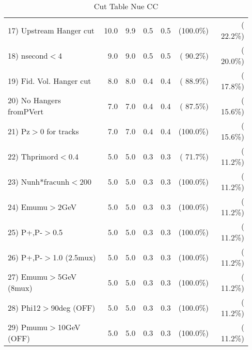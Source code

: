 \begin{table}[h!]
\begin{tabular}{||l||r|r|r|r|r|r||}
 17) Upstream Hanger cut  &         10.0 &          9.9 &          0.5 &          0.5 & (100.0\%) & ( 22.2\%) \\
 18) nsecond$<$4          &          9.0 &          9.0 &          0.5 &          0.5 & ( 90.2\%) & ( 20.0\%) \\
 19) Fid. Vol. Hanger cut &          8.0 &          8.0 &          0.4 &          0.4 & ( 88.9\%) & ( 17.8\%) \\
 20) No Hangers fromPVert &          7.0 &          7.0 &          0.4 &          0.4 & ( 87.5\%) & ( 15.6\%) \\
 21) Pz$>$0 for tracks    &          7.0 &          7.0 &          0.4 &          0.4 & (100.0\%) & ( 15.6\%) \\
 22) Thprimord$<$0.4      &          5.0 &          5.0 &          0.3 &          0.3 & ( 71.7\%) & ( 11.2\%) \\
 23) Nunh*fracunh$<$200   &          5.0 &          5.0 &          0.3 &          0.3 & (100.0\%) & ( 11.2\%) \\
 24) Emumu$>$2GeV         &          5.0 &          5.0 &          0.3 &          0.3 & (100.0\%) & ( 11.2\%) \\
 25) P+,P-$>$0.5          &          5.0 &          5.0 &          0.3 &          0.3 & (100.0\%) & ( 11.2\%) \\
 26) P+,P-$>$1.0 (2.5mux) &          5.0 &          5.0 &          0.3 &          0.3 & (100.0\%) & ( 11.2\%) \\
 27) Emumu$>$5GeV  (8mux) &          5.0 &          5.0 &          0.3 &          0.3 & (100.0\%) & ( 11.2\%) \\
 28) Phi12$>$90deg  (OFF) &          5.0 &          5.0 &          0.3 &          0.3 & (100.0\%) & ( 11.2\%) \\
 29) Pmumu$>$10GeV  (OFF) &          5.0 &          5.0 &          0.3 &          0.3 & (100.0\%) & ( 11.2\%) \\
 \hline
 \hline
 \end{tabular}
 \caption{Cut Table   Nue CC  }
 \label{tab-cutcohjpsi-mumu_nuecc}
 \end{table}
